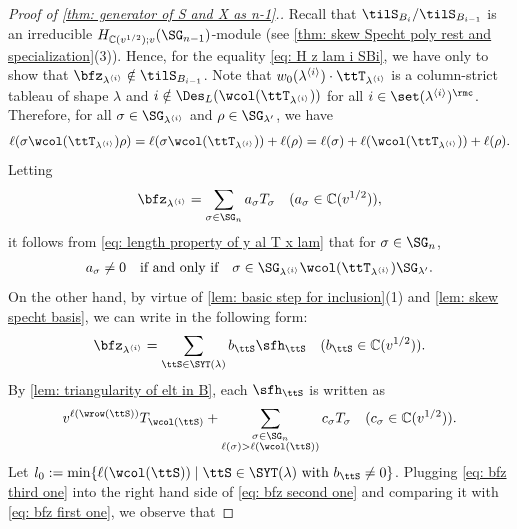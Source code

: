 \documentclass[12pt, reqno]{amsart}
\theoremstyle{plain}
\theoremstyle{definition}
\numberwithin{equation}{section}
\numberwithin{figure}{section}
\numberwithin{table}{section}
\def\C{\mathbb C}
\begin{document}
\begin{proof}[Proof of \protect\cref{thm: generator of S and X as n-1}.]
Recall that  $\tilS_{B_i}/\tilS_{B_{i-1}}$ is an irreducible $H_{\C(v^{1/2});v}(\SG_{n-1})$-module (see \cref{thm: skew Specht poly rest and specialization}(3)).
Hence, for the equality \cref{eq: H z lam i SBi}, we have only to show that $\bfz_{\lambda^{\langle i \rangle}} \notin \tilS_{B_{i-1}}$.
Note that 
$w_0(\lambda^{\langle i \rangle}) \cdot \ttT_{\lambda^{\langle i \rangle}}$ is a column-strict tableau of shape $\lambda$ and 
$i \notin \Des_L(\wcol(\ttT_{\lambda^{\langle i \rangle}}))$ for all $i \in \set({\lambda^{\langle i \rangle}})^\rmc$.
Therefore, for all $\sigma \in \SG_{\lambda^{\langle i \rangle}}$ and $\rho \in \SG_{\lambda'}$, we have 
\begin{align}\label{eq: length property of y al T x lam}
\ell(\sigma \wcol(\ttT_{\lambda^{\langle i \rangle}}) \rho) =  \ell(\sigma \wcol(\ttT_{\lambda^{\langle i \rangle}})) + \ell(\rho)=  \ell(\sigma) + \ell(\wcol(\ttT_{\lambda^{\langle i \rangle}})) + \ell(\rho).
\end{align}
Letting 
\begin{align}\label{eq: bfz first one}
\bfz_{\lambda^{\langle i \rangle}} =  \sum_{\sigma \in \SG_n} a_{\sigma} T_{\sigma} \quad(a_{\sigma} \in \C(v^{1/2})),
\end{align}
it follows from 
\cref{eq: length property of y al T x lam} that for $\sigma \in \SG_n$, 
\begin{align}\label{eq: a tau nonzer cond iff}
    a_{\sigma} \neq 0 \quad\text{if and only if}\quad\sigma \in \SG_{\lambda^{\langle i \rangle}}{\wcol(\ttT_{\lambda^{\langle i \rangle}})}\SG_{\lambda'}.
\end{align}
On the other hand, 
by virtue of   \cref{lem: basic step for inclusion}(1) and \cref{lem: skew specht basis},  we can write in the following form:
\begin{align}\label{eq: bfz second one}
\bfz_{\lambda^{\langle i \rangle}} = 
 \sum_{\ttS \in \SYT(\lambda)} b_{\ttS} \sfh_{\ttS} \quad(b_{\ttS} \in \C(v^{1/2})).
\end{align}
By \cref{lem: triangularity of elt in  B}, each $\sfh_{\ttS}$ is written as 
\begin{align}\label{eq: bfz third one}
v^{\ell(\wrow(\ttS))}
T_{\wcol(\ttS)} + \sum_{\substack{\sigma \in \SG_n \\ \ell(\sigma) > \ell(\wcol(\ttS))}} c_{\sigma }T_{\sigma} \quad(c_\sigma \in \C(v^{1/2})).
\end{align}
Let $l_0 := \min\{\ell(\wcol(\ttS)) \mid \ttS \in \SYT(\lambda) \text{ with }b_{\ttS} \neq 0 \}$.
Plugging \cref{eq: bfz third one} into the right hand side of  \cref{eq: bfz second one} and comparing it with \cref{eq: bfz first one}, we observe that 

\end{proof}
\end{document}
